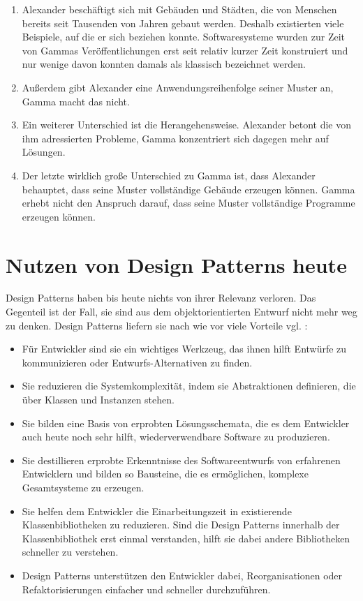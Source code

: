 \documentclass[fontsize=11pt,a4paper,final]{scrreprt}[2003/01/01]
\begin{document}
\begin{enumerate} 
\item Alexander beschäftigt sich mit Gebäuden und Städten, die von Menschen bereits seit Tausenden von Jahren gebaut werden. Deshalb existierten viele Beispiele, auf die er sich beziehen konnte. Softwaresysteme wurden zur Zeit von Gammas Veröffentlichungen erst seit relativ kurzer Zeit konstruiert und nur wenige davon konnten damals als klassisch bezeichnet werden.
\item Außerdem gibt Alexander eine Anwendungsreihenfolge seiner Muster an, Gamma macht das nicht.
\item Ein weiterer Unterschied ist die Herangehensweise. Alexander betont die von ihm adressierten Probleme, Gamma konzentriert sich dagegen mehr auf Lösungen.
\item Der letzte wirklich große Unterschied zu Gamma ist, dass Alexander behauptet, dass seine Muster vollständige Gebäude erzeugen können. Gamma erhebt nicht den Anspruch darauf, dass seine Muster vollständige Programme erzeugen können.
\end{enumerate}

\chapter{Nutzen von Design Patterns heute}\label{se:Design Patterns heute}

Design Patterns haben bis heute nichts von ihrer Relevanz verloren. Das Gegenteil ist der Fall, sie sind aus dem objektorientierten Entwurf nicht mehr weg zu denken. Design Patterns liefern sie nach wie vor viele Vorteile vgl. \cite{Gamma1993}:
\begin{itemize}
	\item Für Entwickler sind sie ein wichtiges Werkzeug, das ihnen hilft Entwürfe zu kommunizieren oder Entwurfs-Alternativen zu finden.
	\item Sie reduzieren die Systemkomplexität, indem sie Abstraktionen definieren, die über Klassen und Instanzen stehen.
	\item Sie bilden eine Basis von erprobten Lösungsschemata, die es dem Entwickler auch heute noch sehr hilft, wiederverwendbare Software zu produzieren.
	\item Sie destillieren erprobte Erkenntnisse des Softwareentwurfs von erfahrenen Entwicklern und bilden so Bausteine, die es ermöglichen, komplexe Gesamtsysteme zu erzeugen.
	\item Sie helfen dem Entwickler die Einarbeitungszeit in existierende Klassenbibliotheken zu reduzieren. Sind die Design Patterns innerhalb der Klassenbibliothek erst einmal verstanden, hilft sie dabei andere Bibliotheken schneller zu verstehen.
	\item Design Patterns unterstützen den Entwickler dabei, Reorganisationen oder Refaktorisierungen einfacher und schneller durchzuführen.
\end{itemize}
   

\newpage

\end{document}

